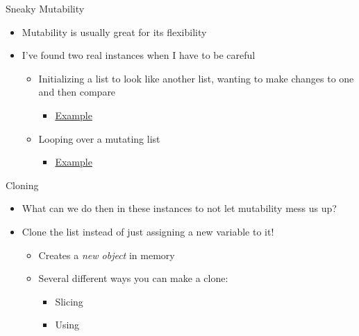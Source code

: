 \documentclass[pdf, aspectratio=169, 12pt]{beamer}
\begin{document}
\begin{frame}[fragile]{Sneaky Mutability}
	\begin{itemize}
		\item Mutability is usually great for its flexibility
		\item I've found two real instances when I have to be careful
			\begin{itemize}
				\item Initializing a list to look like another list, wanting to make changes to one and then compare
					\begin{itemize}
						\item \href{http://www.pythontutor.com/visualize.html#code=A%20%3D%20%5B'Aardvark',%20'Butterfly',%20'Centipede'%5D%0AB%20%3D%20A%0A%0AB.append%28'Deer'%29%0AB.remove%28'Butterfly'%29%0A%0Aprint%28A%29%0Aprint%28B%29&cumulative=false&curInstr=6&heapPrimitives=false&mode=display&origin=opt-frontend.js&py=3&rawInputLstJSON=%5B%5D&textReferences=false}{Example}
					\end{itemize}
					
				\item Looping over a mutating list
					\begin{itemize}
						\item \href{http://www.pythontutor.com/visualize.html#code=A%20%3D%20%5B1,2,3,4,5,6,7,8,9%5D%0A%0Afor%20i,num%20in%20enumerate%28A%29%3A%0A%20%20%20%20print%28'At%20index%3A',%20i%29%0A%20%20%20%20if%203%20%3C%20num%20%3C%206%3A%0A%20%20%20%20%20%20%20%20A.remove%28num%29%0A%20%20%20%0Aprint%28A%29&cumulative=false&curInstr=0&heapPrimitives=false&mode=display&origin=opt-frontend.js&py=3&rawInputLstJSON=%5B%5D&textReferences=false}{Example}
					\end{itemize}
			\end{itemize}
	\end{itemize}
\end{frame}

\begin{frame}{Cloning}
	\begin{itemize}
		\item What can we do then in these instances to not let mutability mess us up?
		\item \alert{Clone} the list instead of just assigning a new variable to it!
			\begin{itemize}
				\item Creates a \emph{new object} in memory
				\item Several different ways you can make a clone:
					\begin{itemize}
						\item Slicing
						\item Using 
					\end{itemize}
			\end{itemize}
	\end{itemize}
\end{frame}
\end{document}
